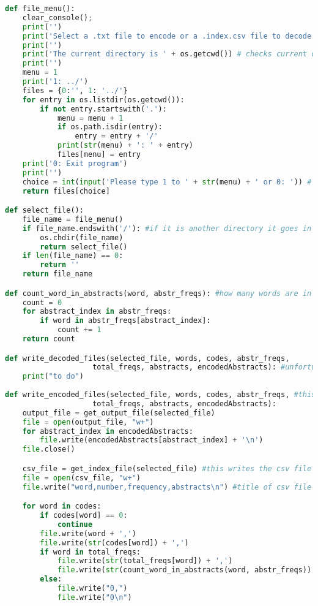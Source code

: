 \documentclass{article}
\begin{document}
\begin{lstlisting}[language=Python]
def file_menu():
    clear_console();
    print('')
    print('Select a .txt file to encode or a .index.csv file to decode')
    print('')
    print('The current directory is ' + os.getcwd()) # checks current directory
    print('')
    menu = 1
    print('1: ../')
    files = {0:'', 1: '../'}
    for entry in os.listdir(os.getcwd()):
        if not entry.startswith('.'):
            menu = menu + 1
            if os.path.isdir(entry):
                entry = entry + '/'
            print(str(menu) + ': ' + entry)
            files[menu] = entry
    print('0: Exit program')
    print('')
    choice = int(input('Please type 1 to ' + str(menu) + ' or 0: ')) # with this function you can navigate through your direcory, much easier then typing it in yourself
    return files[choice]

def select_file():
    file_name = file_menu()
    if file_name.endswith('/'): #if it is another directory it goes in there otherwise it opens the file
        os.chdir(file_name)
        return select_file()
    if len(file_name) == 0:
        return ''
    return file_name

def count_word_in_abstracts(word, abstr_freqs): #how many words are in an abstract?
    count = 0
    for abstract_index in abstr_freqs:
        if word in abstr_freqs[abstract_index]:
            count += 1
    return count

def write_decoded_files(selected_file, words, codes, abstr_freqs,
                    total_freqs, abstracts, encodedAbstracts): #unfortunatly we did not have time to make a decoder...
    print("to do")
    
def write_encoded_files(selected_file, words, codes, abstr_freqs, #this writes the encoded txt file
                    total_freqs, abstracts, encodedAbstracts):
    output_file = get_output_file(selected_file)
    file = open(output_file, "w+")
    for abstract_index in encodedAbstracts:
        file.write(encodedAbstracts[abstract_index] + '\n')
    file.close()

    csv_file = get_index_file(selected_file) #this writes the csv file
    file = open(csv_file, "w+")
    file.write("word,number,frequency,abstracts\n") #title of csv file

    for word in codes:
        if codes[word] == 0:
            continue
        file.write(word + ',')
        file.write(str(codes[word]) + ',')
        if word in total_freqs:
            file.write(str(total_freqs[word]) + ',')
            file.write(str(count_word_in_abstracts(word, abstr_freqs)) + '\n')
        else:
            file.write("0,")
            file.write("0\n")


\end{lstlisting}
\end{document}
